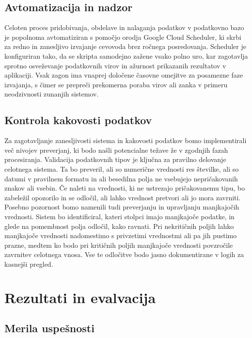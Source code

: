 \documentclass[a4paper,12pt,openright]{book}
\begin{document}
\section{Avtomatizacija in nadzor}

Celoten proces pridobivanja, obdelave in nalaganja podatkov v podatkovno bazo je popolnoma avtomatiziran s pomočjo orodja Google Cloud Scheduler, ki skrbi za redno in zanesljivo izvajanje cevovoda brez ročnega posredovanja. Scheduler je konfiguriran tako, da se skripta samodejno zažene vsako polno uro, kar zagotavlja sprotno osveževanje podatkovnih virov in ažurnost prikazanih rezultatov v aplikaciji. Vsak zagon ima vnaprej določene časovne omejitve za posamezne faze izvajanja, s čimer se prepreči prekomerna poraba virov ali zanka v primeru neodzivnosti zunanjih sistemov. 

\section{Kontrola kakovosti podatkov}
Za zagotavljanje zanesljivosti sistema in kakovosti podatkov bomo implementirali več nivojev preverjanj, ki bodo našli potencialne težave že v zgodnjih fazah procesiranja.
Validacija podatkovnih tipov je ključna za pravilno delovanje celotnega sistema. Ta bo preveril, ali so numerične vrednosti res številke, ali so datumi v pravilnem formatu in ali besedilna polja ne vsebujejo nepričakovanih znakov ali vsebin. Če naleti na vrednosti, ki ne ustrezajo pričakovanemu tipu, bo zabeležil opozorilo in se odločil, ali lahko vrednost pretvori ali jo mora zavrniti. ~\cite{1942_7912}
Posebno pozornost bomo namenili tudi preverjanju in upravljanju manjkajočih vrednosti. Sistem bo identificiral, kateri stolpci imajo manjkajoče podatke, in glede na pomembnost polja odločil, kako ravnati. Pri nekritičnih poljih lahko manjkajoče vrednosti nadomestimo s privzetimi vrednostmi ali pa jih pustimo prazne, medtem ko bodo pri kritičnih poljih manjkajoče vrednosti povzročile zavrnitev celotnega vnosa. Vse te odločitve bodo jasno dokumentirane v logih za kasnejši pregled.

\chapter{Rezultati in evalvacija}
\label{ch:rezultati}


\section{Merila uspešnosti}
\end{document}

